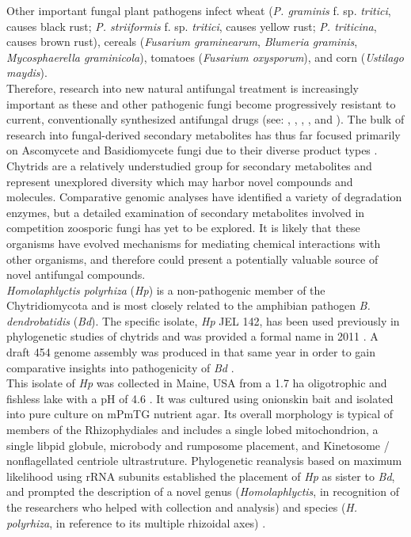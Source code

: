 \indent Other important fungal plant pathogens infect wheat (\textit{P. graminis} f. sp. \textit{tritici}, causes black rust; \textit{P. striiformis} f. sp. \textit{tritici}, causes yellow rust; \textit{P. triticina}, causes brown rust), cereals (\textit{Fusarium graminearum}, \textit{Blumeria graminis}, \textit{Mycosphaerella graminicola}), tomatoes (\textit{Fusarium oxysporum}), and corn (\textit{Ustilago maydis}).\\
\indent Therefore, research into new natural antifungal treatment is increasingly important as these and other pathogenic fungi become progressively resistant to current, conventionally synthesized antifungal drugs (see: \cite{Bossche1998}, \cite{Kontoyiannis2002}, \cite{Kretschmer2009}, \cite{Leroch2011}, and \cite{Pfaller2012}). The bulk of research into fungal-derived secondary metabolites has thus far focused primarily on Ascomycete and Basidiomycete fungi due to their diverse product types \cite{Berdy2012}. Chytrids are a relatively understudied group for secondary metabolites and represent unexplored diversity which may harbor novel compounds and molecules. Comparative genomic analyses have identified a variety of degradation enzymes, but a detailed examination of secondary metabolites involved in competition zoosporic fungi has yet to be explored. It is likely that these organisms have evolved mechanisms for mediating chemical interactions with other organisms, and therefore could present a potentially valuable source of novel antifungal compounds.\\
\indent \textit{Homolaphlyctis polyrhiza} (\textit{Hp}) is a non-pathogenic member of the Chytridiomycota and is most closely related to the amphibian pathogen \textit{B. dendrobatidis} (\textit{Bd}). The specific isolate, \textit{Hp} JEL 142, has been used previously in phylogenetic studies of chytrids \cite{James2000,James2006sixGene,Letcher2008} and was provided a formal name in 2011 \cite{Longcore2011}. A draft 454 genome assembly was produced in that same year in order to gain comparative insights into pathogenicity of \textit{Bd} \cite{Joneson2011}.\\
\indent This isolate of \textit{Hp} was collected in Maine, USA from a 1.7 ha oligotrophic and fishless lake with a pH of 4.6 \cite{Davis1994,Rhodes1995}. It was cultured using onionskin bait and isolated into pure culture on mPmTG nutrient agar. Its overall morphology is typical of members of the Rhizophydiales \cite{Barr1978} and includes a single lobed mitochondrion, a single libpid globule, microbody and rumposome placement, and Kinetosome / nonflagellated centriole ultrastruture. Phylogenetic reanalysis based on maximum likelihood using rRNA subunits established the placement of \textit{Hp} as sister to \textit{Bd}, and prompted the description of a novel genus (\textit{Homolaphlyctis}, in recognition of the researchers who helped with collection and analysis) and species (\textit{H. polyrhiza}, in reference to its multiple rhizoidal axes) \cite{Longcore2011}.\\
